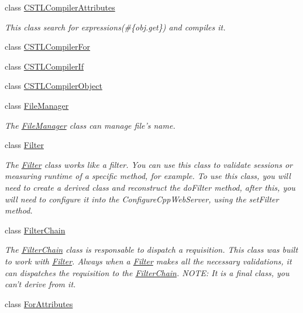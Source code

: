\begin{DoxyCompactItemize}
class \hyperlink{class_c_w_f_1_1_c_s_t_l_compiler_attributes}{C\+S\+T\+L\+Compiler\+Attributes}
\begin{DoxyCompactList}\small\item\em This class search for expressions(\#\{obj.\+get\}) and compiles it. \end{DoxyCompactList}\item 
class \hyperlink{class_c_w_f_1_1_c_s_t_l_compiler_for}{C\+S\+T\+L\+Compiler\+For}
\item 
class \hyperlink{class_c_w_f_1_1_c_s_t_l_compiler_if}{C\+S\+T\+L\+Compiler\+If}
\item 
class \hyperlink{class_c_w_f_1_1_c_s_t_l_compiler_object}{C\+S\+T\+L\+Compiler\+Object}
\item 
class \hyperlink{class_c_w_f_1_1_file_manager}{File\+Manager}
\begin{DoxyCompactList}\small\item\em The \hyperlink{class_c_w_f_1_1_file_manager}{File\+Manager} class can manage file's name. \end{DoxyCompactList}\item 
class \hyperlink{class_c_w_f_1_1_filter}{Filter}
\begin{DoxyCompactList}\small\item\em The \hyperlink{class_c_w_f_1_1_filter}{Filter} class works like a filter. You can use this class to validate sessions or measuring runtime of a specific method, for example. To use this class, you will need to create a derived class and reconstruct the do\+Filter method, after this, you will need to configure it into the Configure\+Cpp\+Web\+Server, using the set\+Filter method. \end{DoxyCompactList}\item 
class \hyperlink{class_c_w_f_1_1_filter_chain}{Filter\+Chain}
\begin{DoxyCompactList}\small\item\em The \hyperlink{class_c_w_f_1_1_filter_chain}{Filter\+Chain} class is responsable to dispatch a requisition. This class was built to work with \hyperlink{class_c_w_f_1_1_filter}{Filter}. Always when a \hyperlink{class_c_w_f_1_1_filter}{Filter} makes all the necessary validations, it can dispatches the requisition to the \hyperlink{class_c_w_f_1_1_filter_chain}{Filter\+Chain}. N\+O\+T\+E\+: It is a final class, you can't derive from it. \end{DoxyCompactList}\item 
class \hyperlink{class_c_w_f_1_1_for_attributes}{For\+Attributes}

\end{DoxyCompactItemize}
